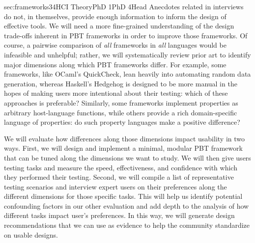 %
  {sec:frameworks}{3}{4}{HCI Theory}{PhD
1}{PhD 4}{Head}
%
Anecdotes related in interviews do not, in themselves, provide enough
information to inform the design of effective tools.  We will need a more
fine-grained understanding of the design trade-offs inherent in PBT frameworks
in order to improve those frameworks.  
Of course, a pairwise comparison of {\em all} frameworks in {\em all}
languages would be infeasible and
unhelpful; rather, we will systematically review prior art to identify major
dimensions along which PBT frameworks differ. For example, some frameworks, like
OCaml's QuickCheck, lean heavily into automating random data generation, whereas
Haskell's Hedgehog is designed to be more manual in the hopes of
making users more intentional about their testing: which of these approaches is
preferable? Similarly, some frameworks implement properties as arbitrary
host-language functions, while others provide a rich domain-specific language of
properties: do such property languages make a positive difference?

We will evaluate how differences along those dimensions impact usability in
two ways. First, we will design and implement a minimal, modular PBT framework
that can be tuned along the dimensions we want to study.  \iflater{}\fi We will
then give users testing tasks and measure the speed, effectiveness, and
confidence with which they performed their testing.  Second, we will compile a
list of representative testing scenarios and interview expert users on their
preferences along the different dimensions for those specific tasks. This will
help us identify potential confounding factors in our other evaluation and add
depth to the analysis of how different tasks impact user's preferences.  In
this way, we will generate design recommendations that we can use as evidence to
help the community standardize on usable designs.

